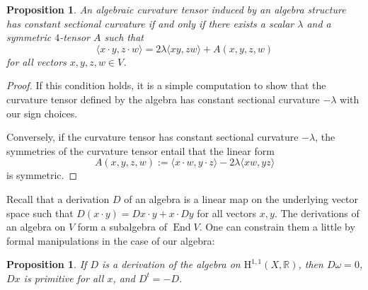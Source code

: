 \documentclass[11pt,a4paper]{amsart}
\newtheorem{prop}[theo]{Proposition}
\theoremstyle{definition}
\theoremstyle{remark}
\newcommand{\End}{\mathop{\mathrm{End}}}
\def\coho#1{\mathrm{H}^{#1}}
\begin{document}
\begin{prop}
An algebraic curvature tensor induced by an algebra structure has constant sectional curvature if and only if there exists a scalar $\lambda$ and a symmetric $4$-tensor $A$ such that
$$
\langle x \cdot y, z \cdot w \rangle
= 2\lambda \langle xy, zw \rangle + A(x,y,z,w)
$$
for all vectors $x,y,z,w \in V$.
\end{prop}

\begin{proof}
  If this condition holds, it is a simple computation to show that the curvature tensor defined by the algebra has constant sectional curvature $-\lambda$ with our sign choices.

  Conversely, if the curvature tensor has constant sectional curvature $-\lambda$, the symmetries of the curvature tensor entail that the linear form
$$
A(x,y,z,w) := \langle x \cdot w, y \cdot z \rangle - 2\lambda \langle xw, yz \rangle
$$
is symmetric.
\end{proof}





Recall that a derivation $D$ of an algebra is a linear map on the underlying vector space such that $D(x \cdot y) = Dx \cdot y + x \cdot Dy$ for all vectors $x,y$. The derivations of an algebra on $V$ form a subalgebra of $\End V$. One can constrain them a little by formal manipulations in the case of our algebra:


\begin{prop}
If $D$ is a derivation of the algebra on $\coho{1,1}(X,\mathbb{R})$, then $D\omega = 0$, $Dx$ is primitive for all $x$, and $D^t = -D$.
\end{prop}
\end{document}
